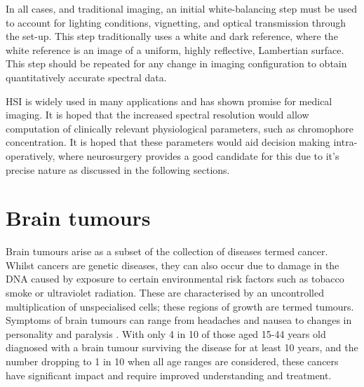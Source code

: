 In all cases, and traditional imaging, an initial white-balancing step must be used to account for lighting conditions, vignetting, and optical transmission through the set-up. This step traditionally uses a white and dark reference, where the white reference is an image of a uniform, highly reflective, Lambertian surface\cite{Lu2014}. This step should be repeated for any change in imaging configuration to obtain quantitatively accurate spectral data. 

HSI is widely used in many applications and has shown promise for medical imaging\cite{Lu2014,Giannoni2018,Calin2014,Shapey2019}. It is hoped that the increased spectral resolution would allow computation of clinically relevant physiological parameters, such as chromophore concentration. It is hoped that these parameters would aid decision making intra-operatively, where neurosurgery provides a good candidate for this due to it's precise nature as discussed in the following sections. 

\section{Brain tumours}
Brain tumours arise as a subset of the collection of diseases termed cancer. Whilst cancers are genetic diseases, they can also occur due to damage in the DNA caused by exposure to certain environmental risk factors such as tobacco smoke or ultraviolet radiation\cite{WorldHealthOrganisation2023}. These are characterised by an uncontrolled multiplication of unspecialised cells; these regions of growth are termed tumours\cite{WorldHealthOrganisation2023}. Symptoms of brain tumours can range from headaches and nausea to changes in personality and paralysis \cite{NationalHealthService2023}. With only 4 in 10 of those aged 15-44 years old diagnosed with a brain tumour surviving the disease for at least 10 years, and the number dropping to 1 in 10 when all age ranges are considered, these cancers have significant impact and require improved understanding and treatment\cite{CancerResearchUK2023}.

